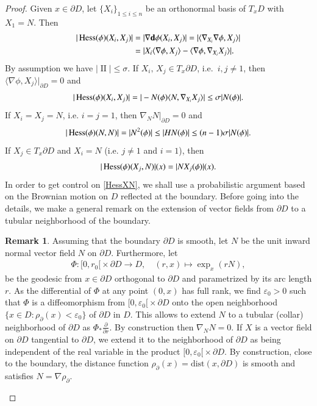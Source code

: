 \documentclass[11pt,reqno]{amsart}
\theoremstyle{definition} \newtheorem{remark}[theorem]{Remark}
\numberwithin{equation}{section}
\newcommand\1{\mathbbm{1}}
\def\bd{{\bf d}}
\def\II{{\operatorname{II}}}
\begin{document}
\begin{proof}
  Given $x\in \partial D$, let $\{X_i\}_{1\leq i\leq n}$ be an
  orthonormal basis of $T_xD$ with $X_1=N$. Then
  \begin{align*}
    |\Hess(\phi)(X_i,X_j)|
    &=|\nabla \bd \phi(X_i,X_j)|=|\langle\nabla_{X_i}\nabla \phi,X_j\rangle|\\
    &=|X_i\langle \nabla \phi, X_j \rangle-\langle \nabla \phi, \nabla_{X_i} X_j\rangle|.
  \end{align*}
 By assumption we have $|\II|\leq \sigma$.
  If $X_i,\,X_j \in T_x \partial D$, i.e.~$i,j \neq 1$, then $\langle \nabla \phi, X_j\rangle|_{\partial D}=0$ and
  \begin{align}\label{add-Hess-boundary1}
    |\operatorname{Hess}(\phi)(X_i,X_j)|=|-N(\phi)\langle N, \nabla_{X_i} X_j\rangle|\leq \sigma|N(\phi)|.
  \end{align}
  If $X_i=X_j=N$, i.e. $i=j=1$, then $\nabla _N N|_{\partial D}=0$ and
  \begin{align}\label{add-Hess-boundary2}
    |\operatorname{Hess}(\phi)(N,N)|= |N^2(\phi)|\leq |H N(\phi)|\leq (n-1)\sigma |N(\phi)|. 
  \end{align}
  If $X_j\in T_x\partial D$ and $X_i=N$ (i.e. $j\neq 1$ and $i=1$),
  then
  \begin{equation}\label{HessXN}
    |\operatorname{Hess}(\phi)(X_j,N)|(x)=|NX_j(\phi)|(x).
  \end{equation}
  In order to get control on \eqref{HessXN}, we shall use a probabilistic argument based
  on the Brownian motion
  on $D$ reflected at the boundary. Before going into the details, we make a general remark
  on the extension of vector fields from $\partial D$ to a tubular neighborhood of the boundary.

\begin{remark}
Assuming that the boundary $\partial D$ is smooth, let $N$ be the unit inward normal vector field $N$ on $\partial D$.
Furthermore, let
\begin{align}\label{TubularNH}
  \Phi\colon {[0,r_0[}\times \partial D\to D,\quad (r,x)\mapsto \exp_x(rN),
\end{align} 
be the geodesic from $x\in\partial D$ orthogonal to $\partial D$ and parametrized by its arc length $r$.
As the differential of $\Phi$ at any point $(0,x)$ has full rank, we find $\varepsilon_0>0$ such that
$\Phi$ is a diffeomorphism from ${[0,\varepsilon_0[}\times \partial D$ 
onto the open neighborhood $\{x\in D\colon \rho_{\partial}(x)<\varepsilon_0\}$ of $\partial D$ in $D$.
This allows to extend $N$ to a tubular (collar) neighborhood of $\partial D$ as
$\Phi_*\frac{\partial}{\partial r}$.
By construction then $\nabla_NN=0$.
If $X$ is a vector field on $\partial D$ tangential to $\partial D$, we extend it to the neighborhood of $\partial D$ as being independent of the real variable in the product 
${[0,\varepsilon_0[}\times \partial D$. By construction, close to the boundary, the distance function
$\rho_{\partial}(x)=\text{dist}(x,\partial D)$ is smooth and satisfies $N=\nabla\rho_{\partial }$.
\end{remark}


\end{proof}
\end{document}
